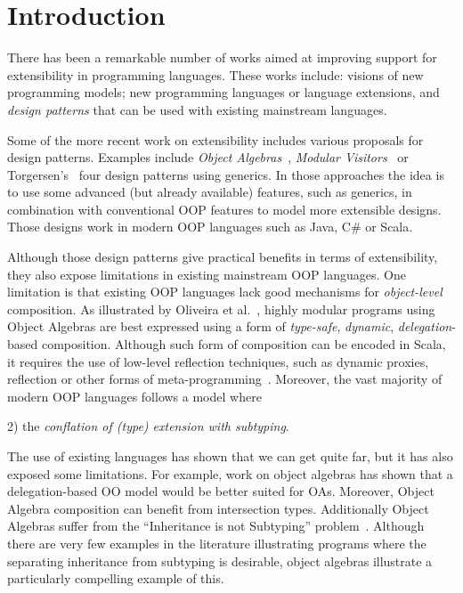 \section{Introduction}


There has been a remarkable number of works aimed at improving support
for extensibility in programming languages. These works include:
visions of new programming models\cite{}; new programming languages or
language extensions\cite{}, and \emph{design patterns} that can be
used with existing mainstream languages.


Some of the more recent work on extensibility includes various
proposals for design patterns.  Examples include \emph{Object
  Algebras}~\cite{}, \emph{Modular Visitors}~\cite{} or
Torgersen's~\cite{} four design patterns using generics. In those
approaches the idea is to use some advanced (but already available)
features, such as generics, in combination with conventional OOP
features to model more extensible designs. Those designs work in
modern OOP languages such as Java, C\# or Scala. 

Although those design patterns give practical benefits in terms of
extensibility, they also expose limitations in existing mainstream OOP
languages. One limitation is that existing OOP languages lack
good mechanisms for \emph{object-level} composition.  As illustrated
by Oliveira et al.~\cite{}, highly modular programs using Object
Algebras are best expressed using a form of \emph{type-safe},
\emph{dynamic}, \emph{delegation}-based composition. Although such
form of composition can be encoded in Scala, it requires the use of
low-level reflection techniques, such as dynamic proxies, reflection
or other forms of meta-programming~\cite{}. Moreover, the vast 
majority of modern OOP languages follows a model where 

 2) the
\emph{conflation of (type) extension with subtyping}.

The use of existing languages has shown that we can get quite far, but
it has also exposed some limitations. For example, work on object
algebras has shown that a delegation-based OO model would be better
suited for OAs. Moreover, Object Algebra composition can benefit from
intersection types. Additionally Object Algebras suffer from the
``Inheritance is not Subtyping'' problem~\cite{cook1989inheritance}.
Although there are very few examples in the literature illustrating
programs where the separating inheritance from subtyping is desirable,
object algebras illustrate a particularly compelling example of this.

